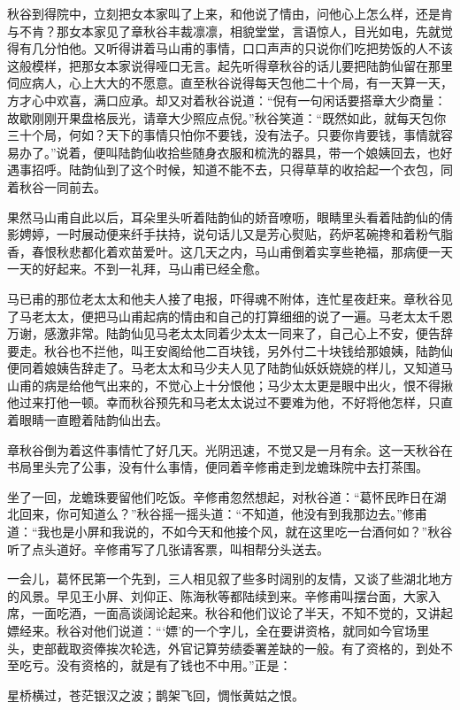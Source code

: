 \documentclass[12pt,UTF8]{ctexbook}
\begin{document}
{{{秋谷到得院中，立刻把女本家叫了上来，和他说了情由，问他心上怎么样，还是肯与不肯？那女本家见了章秋谷丰裁凛凛，相貌堂堂，言语惊人，目光如电，先就觉得有几分怕他。又听得讲着马山甫的事情，口口声声的只说你们吃把势饭的人不该这般模样，把那女本家说得哑口无言。起先听得章秋谷的话儿要把陆韵仙留在那里伺应病人，心上大大的不愿意。直至秋谷说得每天包他二十个局，有一天算一天，方才心中欢喜，满口应承。却又对着秋谷说道：“倪有一句闲话要搭章大少商量：故歇刚刚开果盘格辰光，请章大少照应点倪。”秋谷笑道：“既然如此，就每天包你三十个局，何如？天下的事情只怕你不要钱，没有法子。只要你肯要钱，事情就容易办了。”说着，便叫陆韵仙收拾些随身衣服和梳洗的器具，带一个娘姨回去，也好遇事招呼。陆韵仙到了这个时候，知道不能不去，只得草草的收拾起一个衣包，同着秋谷一同前去。

果然马山甫自此以后，耳朵里头听着陆韵仙的娇音嘹呖，眼睛里头看着陆韵仙的倩影娉婷，一时展动便来纤手扶持，说句话儿又是芳心熨贴，药炉茗碗搀和着粉气脂香，春恨秋悲都化着欢苗爱叶。这几天之内，马山甫倒着实享些艳福，那病便一天一天的好起来。不到一礼拜，马山甫已经全愈。

马已甫的那位老太太和他夫人接了电报，吓得魂不附体，连忙星夜赶来。章秋谷见了马老太太，便把马山甫起病的情由和自己的打算细细的说了一遍。马老太太千恩万谢，感激非常。陆韵仙见马老太太同着少太太一同来了，自己心上不安，便告辞要走。秋谷也不拦他，叫王安阁给他二百块钱，另外付二十块钱给那娘姨，陆韵仙便同着娘姨告辞走了。马老太太和马少夫人见了陆韵仙妖妖娆娆的样儿，又知道马山甫的病是给他气出来的，不觉心上十分恨他；马少太太更是眼中出火，恨不得揪他过来打他一顿。幸而秋谷预先和马老太太说过不要难为他，不好将他怎样，只直着眼睛一直瞪着陆韵仙出去。

章秋谷倒为着这件事情忙了好几天。光阴迅速，不觉又是一月有余。这一天秋谷在书局里头完了公事，没有什么事情，便同着辛修甫走到龙蟾珠院中去打茶围。

坐了一回，龙蟾珠要留他们吃饭。辛修甫忽然想起，对秋谷道：“葛怀民昨日在湖北回来，你可知道么？”秋谷摇一摇头道：“不知道，他没有到我那边去。”修甫道：“我也是小屏和我说的，不如今天和他接个风，就在这里吃一台酒何如？”秋谷听了点头道好。辛修甫写了几张请客票，叫相帮分头送去。

一会儿，葛怀民第一个先到，三人相见叙了些多时阔别的友情，又谈了些湖北地方的风景。早见王小屏、刘仰正、陈海秋等都陆续到来。辛修甫叫摆台面，大家入席，一面吃酒，一面高谈阔论起来。秋谷和他们议论了半天，不知不觉的，又讲起嫖经来。秋谷对他们说道：“‘嫖’的一个字儿，全在要讲资格，就同如今官场里头，吏部截取资俸挨次轮选，外官记算劳绩委署差缺的一般。有了资格的，到处不至吃亏。没有资格的，就是有了钱也不中用。”正是：

星桥横过，苍茫银汉之波；鹊架飞回，惆怅黄姑之恨。

}}}
\end{document}
